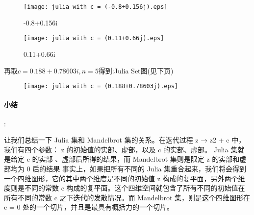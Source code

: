 \documentclass{article}
\begin{document}
    \begin{figure}[htbp]
        \centering
        \begin{minipage}[t]{0.48\textwidth}
        \centering
        \texttt{[image: julia with c = (-0.8+0.156j).eps]}
        \caption{-0.8+0.156i}
        \end{minipage}
        \begin{minipage}[t]{0.48\textwidth}
        \centering
        \texttt{[image: julia with c = (0.11+0.66j).eps]}
        \caption{0.11+0.66i}
        \end{minipage}
    \end{figure}
    \par
    再取$c = 0.188+0.78603i , n = 5$得到:Julia Set图(见下页)
    \begin{figure}[h]
        \centering
        \texttt{[image: julia with c = (0.188+0.78603j).eps]}
    
    \end{figure}




    

    \paragraph{小结}:\par 
    让我们总结一下 Julia 集和 Mandelbrot 集的关系。在迭代过程 z → z2 + c 中，
    我们有四个参数： z 的初始值的实部、虚部，以及 c 的实部、虚部。 Julia 集就是给定 c 的实部
    、虚部后所得的结果，而 Mandelbrot 集则是限定 z 的实部和虚部均为 0 后的结果
    事实上，如果把所有不同的 Julia 集重合起来，我们将会得到一个四维图形，它的其中两个维度是不同的初始值
     z 构成的复平面，另外两个维度则是不同的常数 c 构成的复平面。这个四维空间就包含了所有不同的初始值在所有不同的常数
      c 之下迭代的发散情况。而 Mandelbrot 集，则是这个四维图形在 c = 0 处的一个切片，并且是最具有概括力的一个切片。
    \cite{second}






\end{document}
